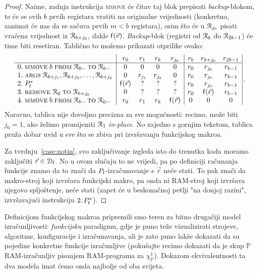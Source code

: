 \begin{proof}
Naime, zadnja instrukcija \textsc{mmove} će čitav taj blok prepisati \emph{backup}-blokom, te će se svih $b$ prvih registara vratiti na originalne vrijednosti (konkretno, zanimat će nas da se sačuva prvih $m<b$ registara), osim što će u $\mathcal R_{j_0}$ pisati vraćena vrijednost iz $\mathcal R_{b+j_0}$, dakle $\f f(\vec r)$. \emph{Backup}-blok (registri od $\mathcal R_{b}$ do $\mathcal R_{2b-1}$) će time biti resetiran. Tablično to možemo prikazati otprilike ovako:
\begin{equation}\label{eq:funmakrotab}
    \begin{array}{r@{\;}l|cccc|ccc|}
      &                                                             & r_0          & r_1     & r_k     & r_{j_0}      & r_b & r_{b+j_0}    & r_{2b-1}\\\hline
0.&\textsc{mmove}\;b\;\textsc{from}\;\reg0..\;\textsc{to}\;\reg{b}..& 0            & 0       & 0       & 0            & r_0 & r_{j_0}      & r_{b-1} \\
1.&\textsc{args}\;\reg{b+j_1},\reg{b+j_2},\dotsc,\reg{b+j_k}        & 0            & r_{j_1} & r_{j_k} & 0            & r_0 & r_{j_0}      & r_{b-1} \\
2.&P_{\f{f}}^*                                                        & \f{f}(\vec r) & ?       & ?       & ?            & r_0 & r_{j_0}      & r_{b-1} \\
3.&\remove{0}{b+j_0}                                                & 0            & ?       & ?       & ?            & r_0 & \f f(\vec r) & r_{b-1}\\
4.&\textsc{mmove}\;b\;\textsc{from}\;\reg{b}..\;\textsc{to}\;\reg0..& r_0          & r_1     & r_k     & \f f(\vec r) & 0   & 0            & 0
    \end{array}\,\text.
\end{equation}
Naravno, tablica nije dovoljno precizna za sve mogućnosti: recimo, može biti $j_0=1$, ako želimo promijeniti $\mathcal R_{1}$ \emph{in-place}. No zajedno s gornjim tekstom, tablica pruža dobar uvid u sve što se zbiva pri izvršavanju funkcijskog makroa.

Za tvrdnju~\ref{case:notin}, svo zaključivanje izgleda isto do trenutka kada moramo zaključiti $\vec r\in\dom{\f{f}}$. No u ovom slučaju to ne vrijedi, pa po definiciji računanja funkcije znamo da to znači da $P_{\f{f}}$-izračunavanje s $\vec r$ neće stati. To pak znači da makro-stroj koji izvršava funkcijski makro, pa onda ni RAM-stroj koji izvršava njegovo spljoštenje, neće stati (zapet će u beskonačnoj petlji "na donjoj razini", izvršavajući instrukciju $2.\,P_{\f f}^*$).
\end{proof}

Definicijom funkcijskog makroa pripremili smo teren za bitno drugačiji model iz\-ra\-čun\-lji\-vo\-sti: \emph{funkcijsku} paradigmu, gdje je puno teže vizualizirati strojeve, algoritme, konfiguracije i izračunavanja, ali je zato puno lakše dokazati da su pojedine konkretne funkcije izračunljive (pokušajte recimo dokazati da je skup $\mathbb P$ RAM-izračunljiv pisanjem RAM-programa za $\chi_{\mathbb P}^1$). Dokazom ekvivalentnosti ta dva modela imat ćemo onda najbolje od oba svijeta.
